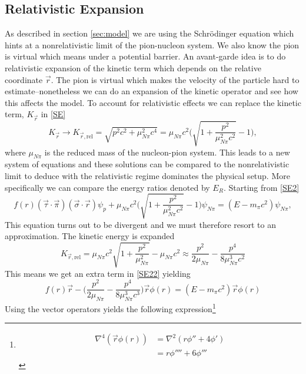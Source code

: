 \subsection{Relativistic Expansion}
As described in section \ref{sec:model} we are using the Schrödinger equation which hints at a nonrelativistic limit of the pion-nucleon system. We also know the pion is virtual which means under a potential barrier. An avant-garde idea is to do relativistic expansion of the kinetic term which depends on the relative coordinate $\vec{r}$. The pion is virtual which makes the velocity of the particle hard to estimate--nonetheless we can do an expansion of the kinetic operator and see how this affects the model. To account for relativistic effects we can replace the kinetic term, $K_{\vec{r}}$ in \eqref{SE}
\begin{equation}
	K_{\vec{r}}\rightarrow K_{\vec{r},\text{rel}} = \sqrt{p^2 c^2+\mu_{N\pi}^2 c^4} = \mu_{N\pi} c^2 \bigg(\sqrt{1+\frac{p^2}{\mu_{N\pi}^2 c^2}}-1 \bigg),
\end{equation}
where $\mu_{N\pi}$ is the reduced mass of the nucleon-pion system. This leads to a new system of equations and these solutions can be compared to the nonrelativistic limit to deduce with the relativistic regime dominates the physical setup. More specifically we can compare the energy ratios denoted by $E_R$. Starting from \eqref{SE2}
\begin{equation}
	f(r) (\vec{\tau} \cdot \vec{\pi})(\vec{\sigma}\cdot \vec{r})\psi_p + \mu_{N\pi} c^2 \bigg(\sqrt{1+\frac{p^2}{\mu_{N\pi}^2 c^2}}-1 \bigg)\psi_{N\pi} = (E-m_{\pi}c^2)\psi_{N\pi},
\end{equation}
This equation turns out to be divergent and we must therefore resort to an approximation. The kinetic energy is expanded
\begin{equation}
	K_{\vec{r},\text{rel}} = \mu_{N\pi} c^2\sqrt{1+\frac{p^2}{\mu_{N\pi}^2}}-\mu_{N\pi} c^2 \approx \frac{p^2}{2\mu_{N\pi}}-\frac{p^4}{8\mu_{N\pi}^3 c^2}
\end{equation}
This means we get an extra term in \eqref{SE22} yielding
\begin{equation}
	f(r)\vec{r}-\bigg( \frac{p^2}{2\mu_{N\pi}}-\frac{p^4}{8\mu_{N\pi}^3 c^3} \bigg)\vec{r}\phi(r) = (E-m_\pi c^2)\vec{r}\phi(r)
\end{equation}
Using the vector operators yields the following expression\footnote{\begin{align*}
		\nabla^4(\vec{r}\phi(r))&=\nabla^2(r\phi''+4\phi') \\
		&=r\phi''''+6\phi'''
\end{align*}}
